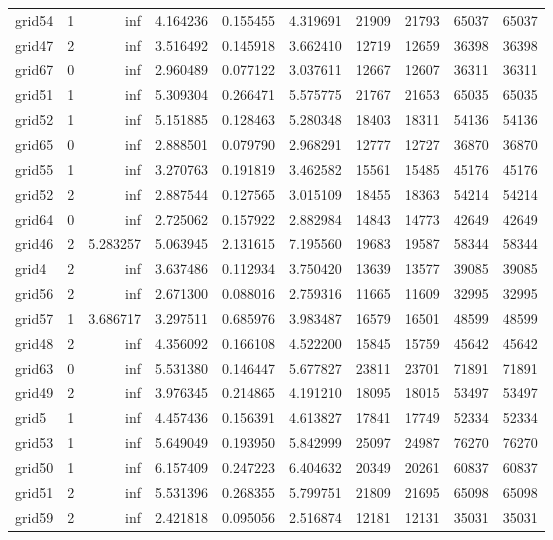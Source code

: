 \begin{longtable}{|l|r|r|r|r|r|r|r|r|r|}
grid54 & 1 & inf & 4.164236 & 0.155455 & 4.319691 & 21909 & 21793 & 65037 & 65037 \\
grid47 & 2 & inf & 3.516492 & 0.145918 & 3.662410 & 12719 & 12659 & 36398 & 36398 \\
grid67 & 0 & inf & 2.960489 & 0.077122 & 3.037611 & 12667 & 12607 & 36311 & 36311 \\
grid51 & 1 & inf & 5.309304 & 0.266471 & 5.575775 & 21767 & 21653 & 65035 & 65035 \\
grid52 & 1 & inf & 5.151885 & 0.128463 & 5.280348 & 18403 & 18311 & 54136 & 54136 \\
grid65 & 0 & inf & 2.888501 & 0.079790 & 2.968291 & 12777 & 12727 & 36870 & 36870 \\
grid55 & 1 & inf & 3.270763 & 0.191819 & 3.462582 & 15561 & 15485 & 45176 & 45176 \\
grid52 & 2 & inf & 2.887544 & 0.127565 & 3.015109 & 18455 & 18363 & 54214 & 54214 \\
grid64 & 0 & inf & 2.725062 & 0.157922 & 2.882984 & 14843 & 14773 & 42649 & 42649 \\
grid46 & 2 & 5.283257 & 5.063945 & 2.131615 & 7.195560 & 19683 & 19587 & 58344 & 58344 \\
grid4 & 2 & inf & 3.637486 & 0.112934 & 3.750420 & 13639 & 13577 & 39085 & 39085 \\
grid56 & 2 & inf & 2.671300 & 0.088016 & 2.759316 & 11665 & 11609 & 32995 & 32995 \\
grid57 & 1 & 3.686717 & 3.297511 & 0.685976 & 3.983487 & 16579 & 16501 & 48599 & 48599 \\
grid48 & 2 & inf & 4.356092 & 0.166108 & 4.522200 & 15845 & 15759 & 45642 & 45642 \\
grid63 & 0 & inf & 5.531380 & 0.146447 & 5.677827 & 23811 & 23701 & 71891 & 71891 \\
grid49 & 2 & inf & 3.976345 & 0.214865 & 4.191210 & 18095 & 18015 & 53497 & 53497 \\
grid5 & 1 & inf & 4.457436 & 0.156391 & 4.613827 & 17841 & 17749 & 52334 & 52334 \\
grid53 & 1 & inf & 5.649049 & 0.193950 & 5.842999 & 25097 & 24987 & 76270 & 76270 \\
grid50 & 1 & inf & 6.157409 & 0.247223 & 6.404632 & 20349 & 20261 & 60837 & 60837 \\
grid51 & 2 & inf & 5.531396 & 0.268355 & 5.799751 & 21809 & 21695 & 65098 & 65098 \\
grid59 & 2 & inf & 2.421818 & 0.095056 & 2.516874 & 12181 & 12131 & 35031 & 35031 \\

\end{longtable}
